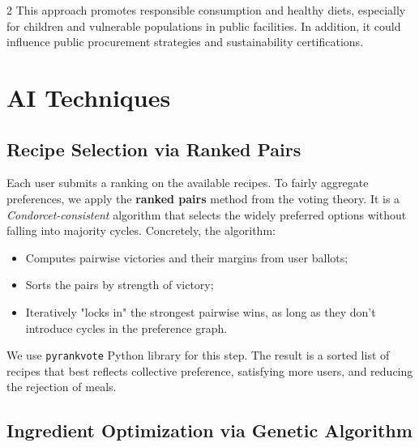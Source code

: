 \documentclass[10pt,a4paper]{article}
\begin{document}
\begin{multicols}{2}
This approach promotes responsible consumption and healthy diets, especially for children and vulnerable populations in public facilities. In addition, it could influence public procurement strategies and sustainability certifications.

\section{AI Techniques}

\subsection{Recipe Selection via Ranked Pairs}

Each user submits a ranking on the available recipes. To fairly aggregate preferences, we apply the \textbf{ ranked pairs} method from the voting theory. It is a \textit{Condorcet-consistent} algorithm that selects the widely preferred options without falling into majority cycles. Concretely, the algorithm:

\begin{itemize}
  \item Computes pairwise victories and their margins from user ballots;
  \item Sorts the pairs by strength of victory;
  \item Iteratively "locks in" the strongest pairwise wins, as long as they don't introduce cycles in the preference graph.
\end{itemize}

We use \texttt{pyrankvote} Python library for this step. The result is a sorted list of recipes that best reflects collective preference, satisfying more users, and reducing the rejection of meals.

\subsection{Ingredient Optimization via Genetic Algorithm}


\end{multicols}
\end{document}
